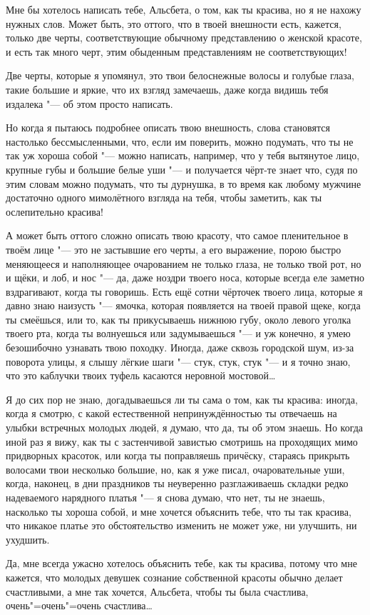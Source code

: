 Мне бы хотелось написать тебе, Альсбета, о том, как ты красива, но я не нахожу
нужных слов.
Может быть, это оттого, что в твоей внешности есть, кажется, только две черты,
соответствующие обычному представлению о женской красоте, и есть так много черт,
этим обыденным представлениям не соответствующих!

Две черты, которые я упомянул, это твои белоснежные волосы и голубые глаза,
такие большие и яркие, что их взгляд замечаешь, даже когда видишь тебя издалека
"--- об этом просто написать.

Но когда я пытаюсь подробнее описать твою внешность, слова становятся настолько
бессмысленными, что, если им поверить, можно подумать, что ты не так уж хороша
собой "--- можно написать, например, что у тебя вытянутое лицо, крупные губы и
большие белые уши "--- и получается чёрт-те знает что, судя по этим словам можно
подумать, что ты дурнушка, в то время как любому мужчине достаточно одного
мимолётного взгляда на тебя, чтобы заметить, как ты ослепительно красива!

А может быть оттого сложно описать твою красоту, что самое пленительное в твоём
лице "--- это не застывшие его черты, а его выражение, порою быстро меняющееся и
наполняющее очарованием не только глаза, не только твой рот, но и щёки, и лоб,
и нос "--- да, даже ноздри твоего носа, которые всегда еле заметно вздрагивают,
когда ты говоришь.
Есть ещё сотни чёрточек твоего лица, которые я давно знаю наизусть "--- ямочка,
которая появляется на твоей правой щеке, когда ты смеёшься, или то, как ты
прикусываешь нижнюю губу, около левого уголка твоего рта, когда ты волнуешься
или задумываешься "--- и уж конечно, я умею безошибочно узнавать твою походку.
Иногда, даже сквозь городской шум, из-за поворота улицы, я слышу лёгкие шаги
"--- стук, стук, стук "--- и я точно знаю, что это каблучки твоих туфель
касаются неровной мостовой\ldots

Я до сих пор не знаю, догадываешься ли ты сама о том, как ты красива: иногда,
когда я смотрю, с какой естественной непринуждённостью ты отвечаешь на улыбки
встречных молодых людей, я думаю, что да, ты об этом знаешь.
Но когда иной раз я вижу, как ты с застенчивой завистью смотришь на проходящих
мимо придворных красоток, или когда ты поправляешь причёску, стараясь прикрыть
волосами твои несколько большие, но, как я уже писал, очаровательные уши, когда,
наконец, в дни праздников ты неуверенно разглаживаешь складки редко надеваемого
нарядного платья "--- я снова думаю, что нет, ты не знаешь, насколько ты хороша
собой, и мне хочется объяснить тебе, что ты так красива, что никакое платье это
обстоятельство изменить не может уже, ни улучшить, ни ухудшить.

Да, мне всегда ужасно хотелось объяснить тебе, как ты красива, потому что мне
кажется, что молодых девушек сознание собственной красоты обычно делает
счастливыми, а мне так хочется, Альсбета, чтобы ты была счастлива,
очень"=очень"=очень счастлива\ldots
